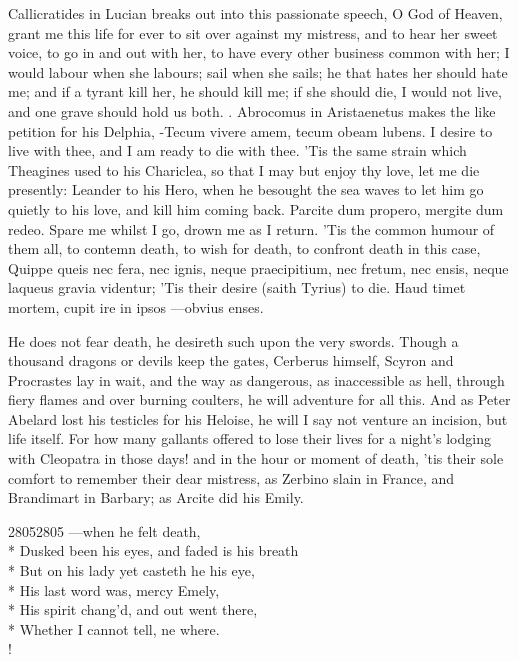 Callicratides in Lucian breaks out into this passionate speech, O
God of Heaven, grant me this life for ever to sit over against my
mistress, and to hear her sweet voice, to go in and out with her, to
have every other business common with her; I would labour when she
labours; sail when she sails; he that hates her should hate me; and if
a tyrant kill her, he should kill me; if she should die, I would not
live, and one grave should hold us both. . Abrocomus in Aristaenetus makes the like
petition for his Delphia, -Tecum vivere amem, tecum obeam lubens.
I desire to live with thee, and I am ready to die with thee. 'Tis the
same strain which Theagines used to his Chariclea, so that I may but
enjoy thy love, let me die presently: Leander to his Hero, when he
besought the sea waves to let him go quietly to his love, and kill him
coming back. Parcite dum propero, mergite dum redeo. Spare me
whilst I go, drown me as I return. 'Tis the common humour of them all,
to contemn death, to wish for death, to confront death in this case,
Quippe queis nec fera, nec ignis, neque praecipitium, nec fretum, nec
ensis, neque laqueus gravia videntur; 'Tis their desire (saith Tyrius)
to die.
Haud timet mortem, cupit ire in ipsos
---obvius enses.

He does not fear death, he desireth such upon the very swords. Though a
thousand dragons or devils keep the gates, Cerberus himself, Scyron and
Procrastes lay in wait, and the way as dangerous, as inaccessible as
hell, through fiery flames and over burning coulters, he will adventure
for all this. And as Peter Abelard lost his testicles for his
Heloise, he will I say not venture an incision, but life itself. For
how many gallants offered to lose their lives for a night's lodging
with Cleopatra in those days! and in the hour or moment of death, 'tis
their sole comfort to remember their dear mistress, as Zerbino
slain in France, and Brandimart in Barbary; as Arcite did his Emily.
%
{\gothfont%
\begin{versewithlinenos}{2}{2805}{2805}%
---when he felt death,\\*
Dusked been his eyes, and faded is his breath\\*
But on his lady yet casteth he his eye,\\*
His last word was, mercy Emely,\\*
His spirit chang'd, and out went there,\\*
Whether I cannot tell, ne where.\\!
\end{versewithlinenos}%
}%

